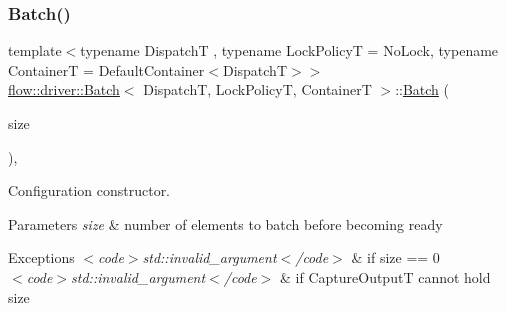 \subsubsection{\texorpdfstring{Batch()}{Batch()}\hspace{0.1cm}{\footnotesize\ttfamily [1/2]}}
{\footnotesize\ttfamily template$<$typename DispatchT , typename Lock\+PolicyT  = No\+Lock, typename ContainerT  = Default\+Container$<$\+Dispatch\+T$>$$>$ \\
\hyperlink{classflow_1_1driver_1_1_batch}{flow\+::driver\+::\+Batch}$<$ DispatchT, Lock\+PolicyT, ContainerT $>$\+::\hyperlink{classflow_1_1driver_1_1_batch}{Batch} (\begin{DoxyParamCaption}\item[{const \hyperlink{classflow_1_1driver_1_1_batch_aa2930228e4fd0f1231a89a5224ae2a0a}{size\+\_\+type}}]{size }\end{DoxyParamCaption})\hspace{0.3cm}{\ttfamily [explicit]}, {\ttfamily [noexcept]}}



Configuration constructor. 


\begin{DoxyParams}{Parameters}
{\em size} & number of elements to batch before becoming ready\\
\hline
\end{DoxyParams}

\begin{DoxyExceptions}{Exceptions}
{\em $<$code$>$std\+::invalid\+\_\+argument$<$/code$>$} & if {\ttfamily size == 0} \\
\hline
{\em $<$code$>$std\+::invalid\+\_\+argument$<$/code$>$} & if {\ttfamily Capture\+OutputT} cannot hold {\ttfamily size} \\
\hline
\end{DoxyExceptions}
\mbox{\label{classflow_1_1driver_1_1_batch_a5c50e03f90dd71df05f988b203a72450}} 

